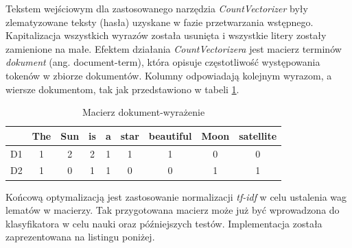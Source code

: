 Tekstem wejściowym dla zastosowanego narzędzia \textit{CountVectorizer} były zlematyzowane teksty (hasła) uzyskane w fazie przetwarzania wstępnego. Kapitalizacja wszystkich wyrazów została usunięta i wszystkie litery zostały zamienione na małe. Efektem działania \textit{CountVectorizera} jest macierz terminów \textit{dokument} (ang. document-term), która opisuje częstotliwość występowania tokenów w zbiorze dokumentów. Kolumny odpowiadają kolejnym wyrazom, a wiersze dokumentom, tak jak przedstawiono w tabeli \ref{countvectorizer-output}.

\begin{table}[ht!]
\centering
\caption{Macierz dokument-wyrażenie}
\label{countvectorizer-output}
\begin{tabular}{|c|c|c|c|c|c|c|c|c|}
\hline
   & The & Sun & is & a & star & beautiful & Moon & satellite \\ \hline
D1 & 1   & 2   & 2  & 1 & 1    & 1         & 0    & 0         \\ \hline
D2 & 1   & 0   & 1  & 1 & 0    & 0         & 1    & 1         \\ \hline
\end{tabular}
\end{table}
\newpage
Końcową optymalizacją jest zastosowanie normalizacji \textit{tf-idf} w celu ustalenia wag lematów w macierzy. Tak przygotowana macierz może już być wprowadzona do klasyfikatora w celu nauki oraz późniejszych testów. Implementacja została zaprezentowana na listingu poniżej.

